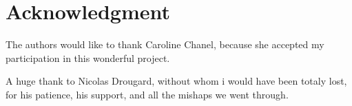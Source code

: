 \documentclass[conference]{IEEEtran}
\newlength\figureheight
\newlength\figurewidth
\newcommand*{\SET}[1]{\ensuremath{\boldsymbol{#1}}}
\begin{document}



%  


\section*{Acknowledgment}

The authors would like to thank Caroline Chanel, because she accepted my participation in this wonderful project.

A huge thank to Nicolas Drougard, without whom i would have been totaly lost, for his patience, his support, and all the mishaps we went through.





\end{document}
